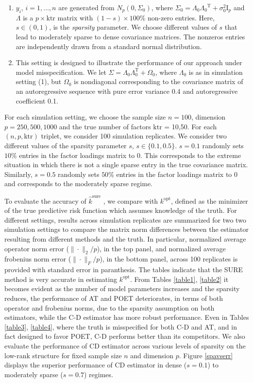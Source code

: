 \documentclass[11pt,oneside]{amsart}
\def\T{{\mathrm{\scriptscriptstyle T}}}
\begin{document}
\begin{enumerate} 
\item $y_i$, $i = 1, \ldots, n$ are generated from $N_p(0,\Sigma_0)$, where $\Sigma_0 = \Lambda_0{\Lambda_0}^{\T} + \sigma_{0}^{2}{\mathrm{I}}_{p}$ and $\Lambda$ is a $p \times {\text{ktr}}$ matrix with $(1 - s) \times 100\%$ non-zero entries. Here, $s \in (0,1)$, is the {\textit{sparsity}} parameter. We choose different values of $s$ that lead to moderately sparse to dense covariance matrices. The nonzeros entries are independently drawn from a standard normal distribution. 

\item This setting is designed to illustrate the performance of our approach under model misspecification. We let $\Sigma = \Lambda_0\Lambda_0^{\T} + \Omega_{0}$, where $\Lambda_0$ is as in simulation setting (1), but $\Omega_0$ is nondiagonal corresponding to the covariance matrix of an autoregressive sequence with pure error variance 0.4 and autoregressive coefficient 0.1. 
\end{enumerate} 

For each simulation setting, we choose the sample size $n = 100$, dimension $p = 250, 500, 1000$ and the true number of factors ${\text{ktr}}$ = 10,50. For each $(n,p,\text{ktr})$ triplet, we consider 100 simulation replicates. We consider two different values of the sparsity parameter $s$, $s \in \{0.1,0.5\}$. $s = 0.1$ randomly sets $10\%$ entries in the factor loadings matrix to 0. This corresponds to the extreme situation in which there is not a single sparse entry in the true covariance matrix. Similarly, $s = 0.5$ randomly sets $50\%$ entries in the factor loadings matrix to 0 and corresponds to the moderately sparse regime.

To evaluate the accuracy of $\widehat{k}^{\text{sure}}$ , we compare with $k^{\text{opt}}$, defined as the minimizer of the true predictive risk function which assumes knowledge of the truth. For different settings, results across simulation replicates are summarized for two two simulation settings to compare the matrix norm differences between the estimator resulting from different methods and the truth. In particular, normalized average operator norm error ($\| \cdot \|_{2}/p$), in the top panel, and normalized average frobenius norm error ($\| \cdot \|_{F}/p$), in the bottom panel, across 100 replicates is provided with standard error in paranthesis. The tables indicate that the SURE method is very accurate in estimating $k^{\text{opt}}$. From Tables \ref{table1}, \ref{table2} it becomes evident as the number of model parameters increases and the sparsity reduces, the performance of AT and POET deteriorates, in terms of both operator and frobenius norms, due to the sparsity assumption on both estimators, while the C-D estimator has more robust performance. Even in Tables \ref{table3}, \ref{table4}, where the truth is misspecified for both C-D and AT, and in fact designed to favor POET, C-D performs better than its competitors. We also evaluate the performance of CD estimator across various levels of sparsity on the low-rank structure for fixed sample size $n$ and dimension $p$.  Figure \ref{spavserr} displays the superior performance of CD estimator in dense ($s = 0.1$) to moderately sparse ($s = 0.7$) regimes. 
\end{document}
